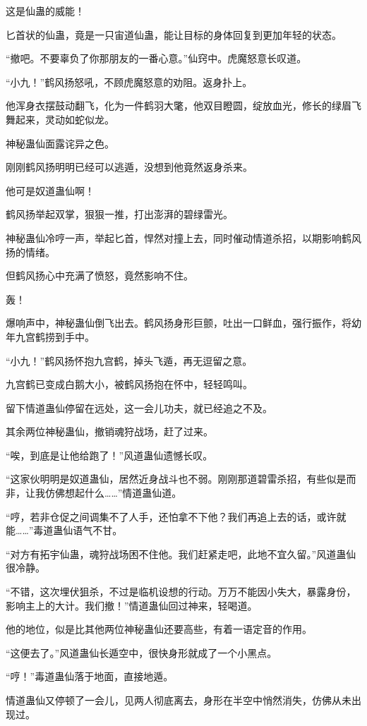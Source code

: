 \begin{this_body}
这是仙蛊的威能！

匕首状的仙蛊，竟是一只宙道仙蛊，能让目标的身体回复到更加年轻的状态。

“撤吧。不要辜负了你那朋友的一番心意。”仙窍中。虎魔怒意长叹道。

“小九！”鹤风扬怒吼，不顾虎魔怒意的劝阻。返身扑上。

他浑身衣摆鼓动翻飞，化为一件鹤羽大氅，他双目瞪圆，绽放血光，修长的绿眉飞舞起来，灵动如蛇似龙。

神秘蛊仙面露诧异之色。

刚刚鹤风扬明明已经可以逃遁，没想到他竟然返身杀来。

他可是奴道蛊仙啊！

鹤风扬举起双掌，狠狠一推，打出澎湃的碧绿雷光。

神秘蛊仙冷哼一声，举起匕首，悍然对撞上去，同时催动情道杀招，以期影响鹤风扬的情绪。

但鹤风扬心中充满了愤怒，竟然影响不住。

轰！

爆响声中，神秘蛊仙倒飞出去。鹤风扬身形巨颤，吐出一口鲜血，强行振作，将幼年九宫鹤捞到手中。

“小九！”鹤风扬怀抱九宫鹤，掉头飞遁，再无逗留之意。

九宫鹤已变成白鹅大小，被鹤风扬抱在怀中，轻轻鸣叫。

留下情道蛊仙停留在远处，这一会儿功夫，就已经追之不及。

其余两位神秘蛊仙，撤销魂狩战场，赶了过来。

“唉，到底是让他给跑了！”风道蛊仙遗憾长叹。

“这家伙明明是奴道蛊仙，居然近身战斗也不弱。刚刚那道碧雷杀招，有些似是而非，让我仿佛想起什么……”情道蛊仙道。

“哼，若非仓促之间调集不了人手，还怕拿不下他？我们再追上去的话，或许就能……”毒道蛊仙语气不甘。

“对方有拓宇仙蛊，魂狩战场困不住他。我们赶紧走吧，此地不宜久留。”风道蛊仙很冷静。

“不错，这次埋伏狙杀，不过是临机设想的行动。万万不能因小失大，暴露身份，影响主上的大计。我们撤！”情道蛊仙回过神来，轻喝道。

他的地位，似是比其他两位神秘蛊仙还要高些，有着一语定音的作用。

“这便去了。”风道蛊仙长遁空中，很快身形就成了一个小黑点。

“哼！”毒道蛊仙落于地面，直接地遁。

情道蛊仙又停顿了一会儿，见两人彻底离去，身形在半空中悄然消失，仿佛从未出现过。


\end{this_body}
